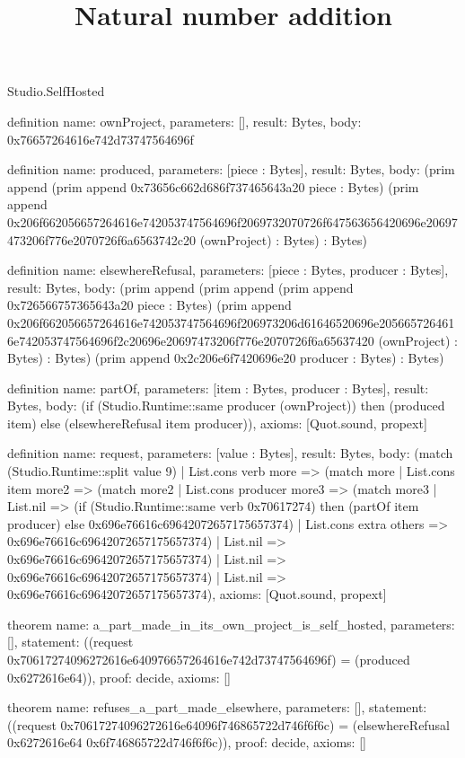 \begin{lexlean}{Studio.SelfHosted}
\title{Natural number addition}
\begin{semanticmodule}
definition{
  name: ownProject,
  parameters: [],
  result: Bytes,
  body: 0x76657264616e742d73747564696f
}

definition{
  name: produced,
  parameters: [piece : Bytes],
  result: Bytes,
  body: (prim append (prim append 0x73656c662d686f737465643a20 piece : Bytes) (prim append 0x206f662056657264616e742053747564696f2069732070726f647563656420696e20697473206f776e2070726f6a6563742c20 (ownProject) : Bytes) : Bytes)
}

definition{
  name: elsewhereRefusal,
  parameters: [piece : Bytes, producer : Bytes],
  result: Bytes,
  body: (prim append (prim append (prim append 0x726566757365643a20 piece : Bytes) (prim append 0x206f662056657264616e742053747564696f206973206d61646520696e2056657264616e742053747564696f2c20696e20697473206f776e2070726f6a65637420 (ownProject) : Bytes) : Bytes) (prim append 0x2c206e6f7420696e20 producer : Bytes) : Bytes)
}

definition{
  name: partOf,
  parameters: [item : Bytes, producer : Bytes],
  result: Bytes,
  body: (if (Studio.Runtime::same producer (ownProject)) then (produced item) else (elsewhereRefusal item producer)),
  axioms: [Quot.sound, propext]
}

definition{
  name: request,
  parameters: [value : Bytes],
  result: Bytes,
  body: (match (Studio.Runtime::split value 9)
    | List.cons verb more => (match more
      | List.cons item more2 => (match more2
        | List.cons producer more3 => (match more3
          | List.nil => (if (Studio.Runtime::same verb 0x70617274) then (partOf item producer) else 0x696e76616c69642072657175657374)
          | List.cons extra others => 0x696e76616c69642072657175657374)
        | List.nil => 0x696e76616c69642072657175657374)
      | List.nil => 0x696e76616c69642072657175657374)
    | List.nil => 0x696e76616c69642072657175657374),
  axioms: [Quot.sound, propext]
}

theorem{
  name: a_part_made_in_its_own_project_is_self_hosted,
  parameters: [],
  statement: ((request 0x70617274096272616e640976657264616e742d73747564696f) = (produced 0x6272616e64)),
  proof: decide{},
  axioms: []
}

theorem{
  name: refuses_a_part_made_elsewhere,
  parameters: [],
  statement: ((request 0x70617274096272616e64096f746865722d746f6f6c) = (elsewhereRefusal 0x6272616e64 0x6f746865722d746f6f6c)),
  proof: decide{},
  axioms: []
}
\end{semanticmodule}
\end{lexlean}
